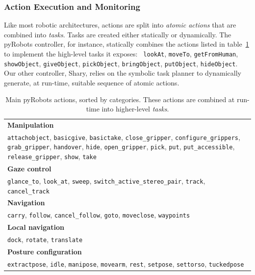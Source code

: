 \documentclass[preprint,3p,times]{elsarticle}
\begin{document}
\subsubsection{Action Execution and Monitoring}\label{sec:action}

Like most robotic architectures, actions are split into \emph{atomic actions}
that are combined into \emph{tasks}. Tasks are created either statically or dynamically.
The {\sc pyRobots} controller, for instance, statically combines the actions listed in
table~\ref{table|pyrobots_actions} to implement the high-level tasks it exposes: {\tt
lookAt}, {\tt moveTo}, {\tt getFromHuman}, {\tt showObject}, {\tt giveObject},
{\tt pickObject}, {\tt bringObject}, {\tt putObject}, {\tt hideObject}.
Our other controller, {\sc Shary}, relies on the symbolic task planner to
dynamically generate, at run-time, suitable sequence of atomic actions.

\begin{table}[ht!]
\begin{center}
\begin{tabular}{p{}}
\hline
    {\bf Manipulation} \\
     {\tt attachobject}, {\tt basicgive}, {\tt basictake}, {\tt close\_gripper}, {\tt configure\_grippers}, {\tt grab\_gripper}, {\tt handover}, {\tt hide}, {\tt open\_gripper}, {\tt pick}, {\tt put}, {\tt put\_accessible}, {\tt release\_gripper}, {\tt show}, {\tt take} \\
\hline
    {\bf Gaze control} \\
     {\tt glance\_to}, {\tt look\_at}, {\tt sweep}, {\tt switch\_active\_stereo\_pair}, {\tt track}, {\tt cancel\_track} \\
\hline
    {\bf Navigation} \\
     {\tt carry}, {\tt follow}, {\tt cancel\_follow}, {\tt goto}, {\tt moveclose}, {\tt waypoints} \\
\hline
    {\bf Local navigation} \\
     {\tt dock}, {\tt rotate}, {\tt translate} \\
\hline
    {\bf Posture configuration} \\
     {\tt extractpose}, {\tt idle}, {\tt manipose}, {\tt movearm}, {\tt rest}, {\tt setpose}, {\tt settorso}, {\tt tuckedpose} \\
\hline
\end{tabular}
\end{center}
\caption{Main {\sc pyRobots} actions, sorted by categories. These
actions are combined at run-time into higher-level \emph{tasks}.}

\label{table|pyrobots_actions}
\end{table}
\end{document}
